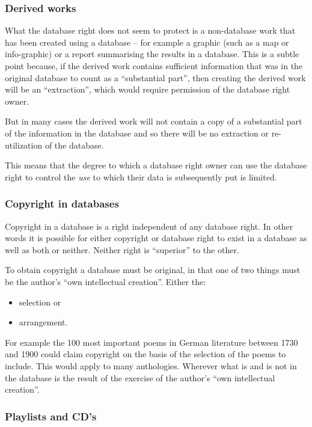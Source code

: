 \subsubsection{Derived works}\label{derived-works}

What the database right does not seem to protect is a non-database work
that has been created using a database -- for example a graphic (such as
a map or info-graphic) or a report summarising the results in a
database. This is a subtle point because, if the derived work contains
sufficient information that was in the original database to count as a
``substantial part'', then creating the derived work will be an
``extraction'', which would require permission of the database right
owner.

But in many cases the derived work will not contain a copy of a
substantial part of the information in the database and so there will be
no extraction or re-utilization of the database.

This means that the degree to which a database right owner can use the
database right to control the \emph{use} to which their data is
subsequently put is limited.

\subsubsection{Copyright in databases}\label{copyright-in-databases}

Copyright in a database is a right independent of any database right. In
other words it is possible for either copyright or database right to
exist in a database as well as both or neither. Neither right is
``superior'' to the other.

To obtain copyright a database must be original, in that one of two
things must be the author's ``own intellectual creation''. Either the:

\begin{itemize}
\item
  selection or
\item
  arrangement.
\end{itemize}

For example the 100 most important poems in German literature between
1730 and 1900 could claim copyright on the basis of the selection of the
poems to include. This would apply to many anthologies. Wherever what is
and is not in the database is the result of the exercise of the author's
``own intellectual creation''.

\subsubsection{Playlists and CD's}\label{playlists-and-cds}

